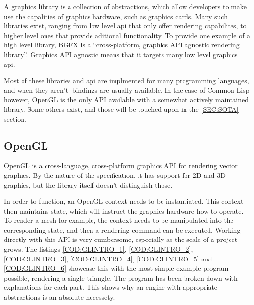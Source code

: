 A graphics library is a collection of abstractions,
which allow developers to make use the capalities of graphics hardware,
such as graphics cards.
Many such libraries exist,
ranging from low level \acs{api} that only offer rendering capabilites,
to higher level ones that provide aditional functionality.
To provide one example of a high level library,
BGFX is a ``cross-platform, graphics API agnostic rendering library''.
Graphics API agnostic means that it targets many low level graphics \acs{api}.

Most of these libraries and \acs{api} are implmented for many programming languages,
and when they aren't,
bindings are usually available.
In the case of Common Lisp however,
OpenGL is the only API available with a somewhat actively maintained library.
Some others exist,
and those will be touched upon in the \ref{SEC:SOTA} section.

\subsection{OpenGL}

OpenGL is a cross-language,
cross-platform graphics API for rendering vector graphics.
By the nature of the specification,
it has support for 2D and 3D graphics,
but the library itself doesn't distinguish those.

In order to function,
an OpenGL context needs to be instantiated.
This context then maintains state,
which will instruct the graphics hardware how to operate.
To render a mesh for example,
the context needs to be manipulated into the corresponding state,
and then a rendering command can be executed.
Working directly with this API is very cumbersome,
especially as the scale of a project grows.
The listings \ref{COD:GLINTRO_1},
\ref{COD:GLINTRO_2},
\ref{COD:GLINTRO_3},
\ref{COD:GLINTRO_4},
\ref{COD:GLINTRO_5} and \ref{COD:GLINTRO_6}
showcase this with the most simple example program possible,
rendering a single triangle.
The program has been broken down with explanations for each part.
This shows why an engine with appropriate abstractions is an absolute necessety.



